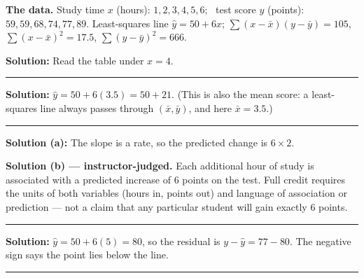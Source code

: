 \documentclass[12pt]{article}
\begin{document}



\noindent\textbf{The data.} Study time $x$ (hours): $1, 2, 3, 4, 5, 6$; \ test score $y$
(points): $59, 59, 68, 74, 77, 89$. Least-squares line $\hat{y} = 50 + 6x$;
$\sum(x-\bar{x})(y-\bar{y}) = 105$, $\sum(x-\bar{x})^2 = 17.5$,
$\sum(y-\bar{y})^2 = 666$.


\textbf{Solution:} \quad Read the table under $x = 4$. 

\vspace{0.15cm}\noindent\rule{\linewidth}{0.2pt}\vspace{0.15cm}


\textbf{Solution:} \quad $\hat{y} = 50 + 6(3.5) = 50 + 21$. (This is also the mean score:
a least-squares line always passes through $(\bar{x}, \bar{y})$, and here
$\bar{x} = 3.5$.) 

\vspace{0.15cm}\noindent\rule{\linewidth}{0.2pt}\vspace{0.15cm}


\textbf{Solution (a):} \quad The slope is a rate, so the predicted change is
$6 \times 2$. 

\textbf{Solution (b) --- instructor-judged.} \quad Each additional hour of study is associated
with a predicted increase of $6$ points on the test. Full credit requires the units of both
variables (hours in, points out) and language of association or prediction --- not a claim
that any particular student will gain exactly $6$ points.

\vspace{0.15cm}\noindent\rule{\linewidth}{0.2pt}\vspace{0.15cm}


\textbf{Solution:} \quad $\hat{y} = 50 + 6(5) = 80$, so the residual is
$y - \hat{y} = 77 - 80$. The negative sign says the point lies below the line.

\vspace{0.15cm}\noindent\rule{\linewidth}{0.2pt}\vspace{0.15cm}
\end{document}
